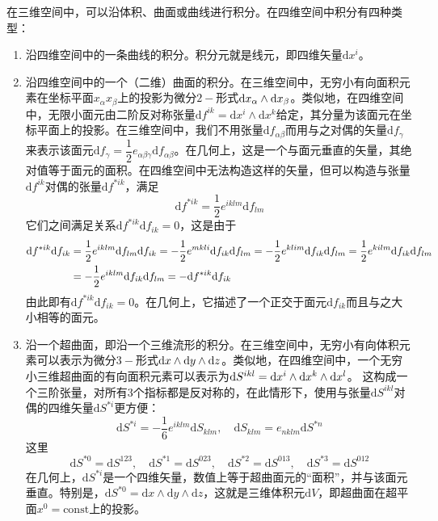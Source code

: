 在三维空间中，可以沿体积、曲面或曲线进行积分。在四维空间中积分有四种类型：
\begin{enumerate}
\item 沿四维空间中的一条曲线的积分。积分元就是线元，即四维矢量$\mathrm{d}x^i$。

\item 沿四维空间中的一个（二维）曲面的积分。在三维空间中，无穷小有向面积元素在坐标平面$x_\alpha x_\beta$上的投影为微分$2-$形式$\mathrm{d} x_\alpha \wedge \mathrm{d} x_\beta$。类似地，在四维空间中，无限小面元由二阶反对称张量$\mathrm{d}f^{ik}=\mathrm{d} x^i \wedge \mathrm{d}x^k$给定，其分量为该面元在坐标平面上的投影。在三维空间中，我们不用张量$\mathrm{d}f_{\alpha\beta}$而用与之对偶的矢量$\mathrm{d}f_\gamma$来表示该面元$\mathrm{d}f_\gamma = \dfrac12 e_{\alpha\beta\gamma} \mathrm{d}f_{\alpha\beta}$。在几何上，这是一个与面元垂直的矢量，其绝对值等于面元的面积。在四维空间中无法构造这样的矢量，但可以构造与张量$\mathrm{d}f^{ik}$对偶的张量$\mathrm{d}f^{*ik}$，满足
\begin{equation}
	\mathrm{d}f^{*ik} = \frac12 e^{iklm}\mathrm{d}f_{lm}
\end{equation}
它们之间满足关系$\mathrm{d}f^{*ik}\mathrm{d}f_{ik} = 0$，这是由于%
\begin{align*}
	\mathrm{d}f^{*ik}\mathrm{d}f_{ik} & = \frac12 e^{iklm}\mathrm{d}f_{lm} \mathrm{d} f_{ik} = -\frac12 e^{mkli} \mathrm{d} f_{ik}\mathrm{d}f_{lm} = -\frac12 e^{klim} \mathrm{d} f_{ik}\mathrm{d}f_{lm} = \frac12 e^{kilm} \mathrm{d} f_{ik}\mathrm{d}f_{lm} \\
	& = -\frac12 e^{iklm} \mathrm{d} f_{ik}\mathrm{d} f_{lm} = -\mathrm{d}f^{*ik}\mathrm{d}f_{ik}
\end{align*}
由此即有$\mathrm{d}f^{*ik}\mathrm{d}f_{ik} = 0$。在几何上，它描述了一个正交于面元$\mathrm{d}f_{ik}$而且与之大小相等的面元。

\item 沿一个超曲面，即沿一个三维流形的积分。在三维空间中，无穷小有向体积元素可以表示为微分$3-$形式$\mathrm{d} x\wedge \mathrm{d} y\wedge \mathrm{d} z$。类似地，在四维空间中，一个无穷小三维超曲面的有向面积元素可以表示为$\mathrm{d} S^{ikl} = \mathrm{d} x^i\wedge \mathrm{d} x^k \wedge \mathrm{d} x^l$。
这构成一个三阶张量，对所有3个指标都是反对称的，在此情形下，使用与张量$\mathrm{d}S^{ikl}$对偶的四维矢量$\mathrm{d}S^{*i}$更方便：
\begin{equation}
	\mathrm{d}S^{*i} = -\frac16 e^{iklm} \mathrm{d}S_{klm},\quad \mathrm{d}S_{klm} = e_{nklm}\mathrm{d}S^{*n}
\end{equation}
这里
\begin{equation*}
	\mathrm{d}S^{*0} = \mathrm{d}S^{123},\quad \mathrm{d}S^{*1} = \mathrm{d}S^{023},\quad \mathrm{d}S^{*2} = \mathrm{d}S^{013},\quad \mathrm{d}S^{*3} = \mathrm{d}S^{012}
\end{equation*}
在几何上，$\mathrm{d}S^{*i}$是一个四维矢量，数值上等于超曲面元的“面积”，并与该面元垂直。特别是，$\mathrm{d}S^{*0} = \mathrm{d}x\wedge \mathrm{d}y \wedge \mathrm{d}z$，这就是三维体积元$\mathrm{d}V$，即超曲面在超平面$x^0=\text{const}$上的投影。


\end{enumerate}
